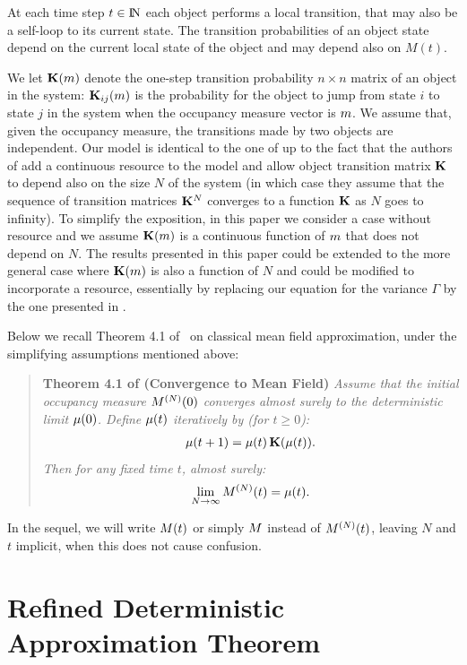 \documentclass[review]{elsarticle}
\begin{document}
At each time step $t \in \mathrm{I\!N}$ each object performs a local
transition, that may also be a self-loop to its current state.  The
transition probabilities of an object state depend on the current
local state of the object and may depend also on $M(t)$.

We let $\mathbf{K}(m)$ denote the one-step transition probability
$n \times n$ matrix of an object in the system: $\mathbf{K}_{ij}(m)$
is the probability for the object to jump from state $i$ to state $j$
in the system when the occupancy measure vector is $m$. We assume
that, given the occupancy measure, the transitions made by two objects
are independent. Our model is identical to the one of \cite{Le+07} up
to the fact that the authors of \cite{Le+07} add a continuous resource
to the model and allow object transition matrix $\mathbf{K}$ to depend also on
the size $N$ of the system (in which case they assume
that the sequence of transition matrices $\mathbf{K}^N$ converges to a function
$\mathbf{K}$ as $N$ goes to infinity). To simplify the exposition, in this
paper we consider a case without resource and we assume
$\mathbf{K}(m)$ is a continuous function of $m$ that does not
depend on $N$. The results presented in this paper could be extended
to the more general case where $\mathbf{K}(m)$ is also a function of
$N$ and could be modified to incorporate a resource, essentially by
replacing our equation for the variance $\Gamma$ by the one presented
in \cite[Equation~(7)]{gastgaujalDEDS}.

Below we recall Theorem 4.1 of~\cite{Le+07} on classical mean field
approximation, under the simplifying assumptions mentioned above:

\begin{quotation}
\noindent
{\bf Theorem 4.1 of \cite{Le+07} (Convergence to Mean Field)}
{\em Assume that the initial occupancy measure $M^{(N)}(0)$ converges almost surely to the deterministic limit $\mu(0)$. 
Define $\mu(t)$ iteratively by (for $t \geq 0$):
\begin{align}
  \label{eq:mu}
  \mu(t+1) = \mu(t) \, \mathbf{K}(\mu(t)).
\end{align}
Then for any fixed time $t$, almost surely:
$$
\lim_{N \to \infty} M^{(N)}(t) = \mu(t).
$$
}
\end{quotation}
In the sequel, we will write $M(t)$ or simply $M$ instead of
$M^{(N)}(t)$, leaving $N$ and $t$ implicit, when this does not cause
confusion.

\section{Refined Deterministic Approximation Theorem}
\label{sect:Refined}
\end{document}
